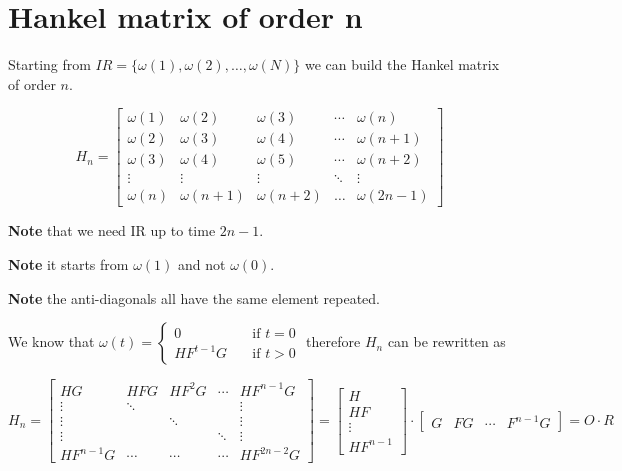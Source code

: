 \section{Hankel matrix of order n}

Starting from $IR = \{\omega(1), \omega(2), \ldots, \omega(N)\}$ we can build the Hankel matrix of order $n$.

\[
    H_n = \begin{bmatrix}
        \omega(1) & \omega(2) & \omega(3) & \cdots & \omega(n) \\
        \omega(2) & \omega(3) & \omega(4) & \cdots & \omega(n+1) \\
        \omega(3) & \omega(4) & \omega(5) & \cdots & \omega(n+2) \\
        \vdots    & \vdots    & \vdots    & \ddots & \vdots \\
        \omega(n) & \omega(n+1) & \omega(n+2) & \ldots & \omega(2n-1)
    \end{bmatrix}
\]

\textbf{Note} that we need IR up to time $2n-1$.

\textbf{Note} it starts from $\omega(1)$ and not $\omega(0)$.

\textbf{Note} the anti-diagonals all have the same element repeated.

We know that $\omega(t) = \begin{cases}
    0 &\quad \text{if } t = 0 \\
    HF^{t-1}G &\quad \text{if } t > 0
\end{cases}$ therefore $H_n$ can be rewritten as

\[
    H_n = \begin{bmatrix}
        HG     & HFG    & HF^2G  & \cdots & HF^{n-1}G \\
        \vdots & \ddots &        &        & \vdots \\
        \vdots &        & \ddots &        & \vdots \\
        \vdots &        &        & \ddots & \vdots \\
        HF^{n-1}G & \cdots & \cdots & \cdots & HF^{2n-2}G
    \end{bmatrix} = \begin{bmatrix}
        H \\
        HF \\
        \vdots \\
        HF^{n-1}
    \end{bmatrix} \cdot \begin{bmatrix}
        G & FG & \cdots & F^{n-1}G
    \end{bmatrix} = O \cdot R
\]


